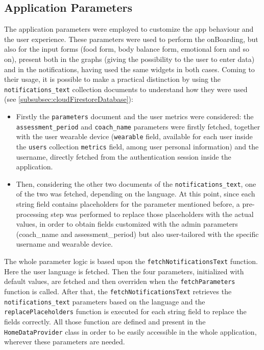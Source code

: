 \subsection{Application Parameters}
\label{subsec:applicationParameters}
The application parameters were employed to customize the app behaviour and the user experience. These parameters were used to perform the onBoarding, but also for the input forms (food form, body balance form, emotional forn and so on), present both in the graphs (giving the possibility to the user to enter data) and in the notifications, having used the same widgets in both cases.
\newline Coming to their usage, it is possible to make a practical distinction by using the \texttt{notifications\_text} collection documents to understand how they were used (see \cref{subsubsec:cloudFirestoreDatabase}):
\begin{itemize}[nosep] %
    \item Firstly the \texttt{parameters} document and the user metrics were considered: the \newline\texttt{assessment\_period} and \texttt{coach\_name} parameters were firstly fetched, together with the user wearable device (\texttt{wearable} field, available for each user inside the \texttt{users} collection \texttt{metrics} field, among user personal information) and the username, directly fetched from the authentication session inside the application.
    \item Then, considering the other two documents of the \texttt{notifications\_text}, one of the two was fetched, depending on the language. At this point, since each string field contains placeholders for the parameter mentioned before, a pre-processing step was performed to replace those placeholders with the actual values, in order to obtain fields customized with the admin parameters (coach\_name and assessment\_period) but also user-tailored with the specific username and wearable device. 
\end{itemize}

\noindent The whole parameter logic is based upon the \texttt{fetchNotificationsText} function. Here the user language is fetched. Then the four parameters, initialized with default values, are fetched and then overriden when the \texttt{fetchParameters} function is called. After that, the \texttt{fetchNotificationsText} retrieves the \texttt{notifications\_text} parameters based on the language and the \texttt{replacePlaceholders} function is executed for each string field to replace the fields correctly. All those function are defined and present in the \texttt{HomeDataProvider} class in order to be easily accessible in the whole application, wherever these parameters are needed.

